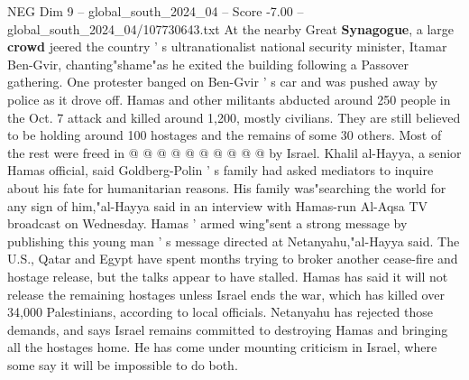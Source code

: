 \begin{textsample}{NEG Dim 9 – global\_south\_2024\_04 – Score -7.00 – global\_south\_2024\_04/107730643.txt}
At the nearby Great \textbf{Synagogue}, a large \textbf{crowd} jeered the country ' s ultranationalist national security minister, Itamar Ben-Gvir, chanting"shame"as he exited the building following a Passover gathering.
One protester banged on Ben-Gvir ' s car and was pushed away by police as it drove off.
Hamas and other militants abducted around 250 people in the Oct. 7 attack and killed around 1,200, mostly civilians.
They are still believed to be holding around 100 hostages and the remains of some 30 others.
Most of the rest were freed in @ @ @ @ @ @ @ @ @ @ by Israel.
Khalil al-Hayya, a senior Hamas official, said Goldberg-Polin ' s family had asked mediators to inquire about his fate for humanitarian reasons.
His family was"searching the world for any sign of him,"al-Hayya said in an interview with Hamas-run Al-Aqsa TV broadcast on Wednesday.
Hamas ' armed wing"sent a strong message by publishing this young man ' s message directed at Netanyahu,"al-Hayya said.
The U.S., Qatar and Egypt have spent months trying to broker another cease-fire and hostage release, but the talks appear to have stalled.
Hamas has said it will not release the remaining hostages unless Israel ends the war, which has killed over 34,000 Palestinians, according to local officials.
Netanyahu has rejected those demands, and says Israel remains committed to destroying Hamas and bringing all the hostages home.
He has come under mounting criticism in Israel, where some say it will be impossible to do both.

\end{textsample}
